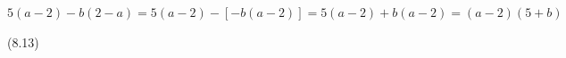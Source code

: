 {\begin{mdframed}[linewidth=4, leftmargin=40, rightmargin=40]
\begin{exercise}
\begin{enumerate}[noitemsep, label=\textbf{Step} \textbf{\arabic*}. ]
{\begin{equation}
      \end{equation}
    }{%
    \setlength{\mymathboxwidth}{\columnwidth}
      \addtolength{\mymathboxwidth}{-48pt}
    \par\vspace{12pt}\noindent\begin{minipage}{\columnwidth}
    \parbox[t]{\mymathboxwidth}{\large$
    5\left(a-2\right)-b\left(2-a\right)=5\left(a-2\right)-\left[-b\left(a-2\right)\right]=5\left(a-2\right)+b\left(a-2\right)=\left(a-2\right)\left(5+b\right)$}\hfill
    \parbox[t]{48pt}{\raggedleft 
    (8.13)}
    \end{minipage}\vspace{12pt}\par
    }%
          \end{enumerate}
    \end{exercise}
    \end{mdframed}
    }
    \noindent
\label{m39383*secfhsst!!!underscore!!!id923}
